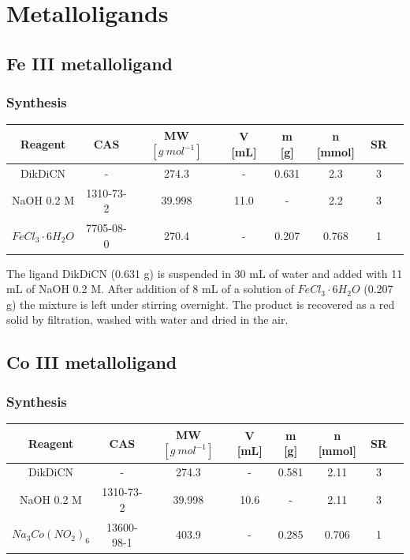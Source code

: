 \documentclass[../Master.tex]{subfiles}
\begin{document}
\section{Metalloligands}\label{sec:metalloligands}

\subsection{Fe III metalloligand}

\subsubsection{Synthesis}
\begin{center}
	\begin{tabular}[b]{cccccccc}
		\toprule
		Reagent                   & CAS       & MW \([g \ mol^{-1}]\) & V [mL] & m [g] & n [mmol] & SR \\
		\midrule
		DikDiCN                   & -         & 274.3                 & -      & 0.631 & 2.3      & 3  \\
		NaOH 0.2 M                & 1310-73-2 & 39.998                & 11.0   & -     & 2.2      & 3  \\
		\(FeCl_{3} \cdot 6 H_2O\) & 7705-08-0 & 270.4                 & -      & 0.207 & 0.768    & 1  \\
		\bottomrule
	\end{tabular}
\end{center}

The ligand DikDiCN (0.631 g) is suspended in 30 mL of water and added with 11 mL of NaOH 0.2 M. After addition of 8 mL of a solution of \(FeCl_{3} · 6H_2O\) (0.207 g) the mixture is left under stirring overnight. The product is recovered as a red solid by filtration, washed with water and dried in the air.

\newpage
\subsection{Co III metalloligand}

\subsubsection{Synthesis}
\begin{center}
	\begin{tabular}[b]{cccccccc}
		\toprule
		Reagent                & CAS        & MW \([g \ mol^{-1}]\) & V [mL] & m [g] & n [mmol] & SR \\
		\midrule
		DikDiCN                & -          & 274.3                 & -      & 0.581 & 2.11     & 3  \\
		NaOH 0.2 M             & 1310-73-2  & 39.998                & 10.6   & -     & 2.11     & 3  \\
		$Na_{3}Co(NO_{2})_{6}$ & 13600-98-1 & 403.9                 & -      & 0.285 & 0.706    & 1  \\
		\bottomrule
	\end{tabular}
\end{center}
\end{document}
